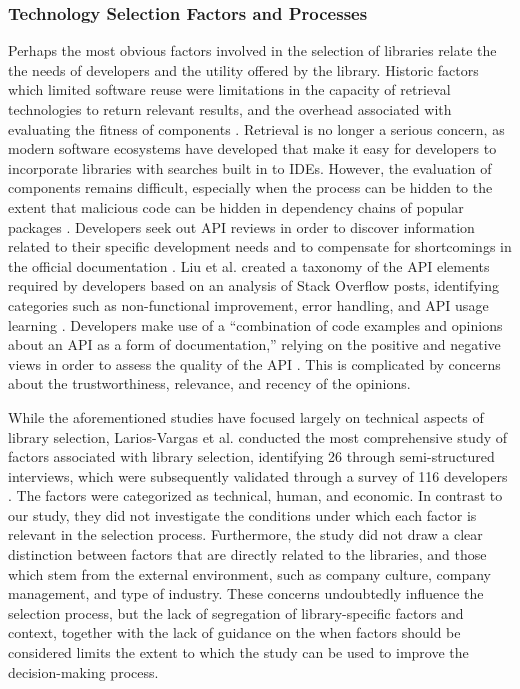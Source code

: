 \subsubsection{Technology Selection Factors and Processes}\label{sec:lit:processes}

Perhaps the most obvious factors involved in the selection of libraries relate the the needs of developers and the utility offered by the library. Historic factors which limited software reuse were limitations in the capacity of retrieval technologies to return relevant results, and the overhead associated with evaluating the fitness of components \cite{hummel2008code}. Retrieval is no longer a serious concern, as modern software ecosystems have developed that make it easy for developers to incorporate libraries with searches built in to IDEs. However, the evaluation of components remains difficult, especially when the process can be hidden to the extent that malicious code can be hidden in dependency chains of popular packages \cite{wyss2022wolf}. Developers seek out API reviews in order to discover information related to their specific development needs and to compensate for shortcomings in the official documentation \cite{uddin2019understanding}. Liu et al. created a taxonomy of the API elements required by developers based on an analysis of Stack Overflow posts, identifying categories such as non-functional improvement, error handling, and API usage learning \cite{liu2021api}. Developers make use of a ``combination of code examples and opinions about an API as a form of documentation,'' relying on the positive and negative views in order to assess the quality of the API \cite{uddin2019understanding}. This is complicated by concerns about the trustworthiness, relevance, and recency of the opinions. %

While the aforementioned studies have focused largely on technical aspects of library selection, Larios-Vargas et al. conducted the most comprehensive study of factors associated with library selection, identifying 26 through semi-structured interviews, which were subsequently validated through a survey of 116 developers \cite{larios2020selecting}. The factors were categorized as technical, human, and economic. In contrast to our study, they did not investigate the conditions under which each factor is relevant in the selection process. Furthermore, the study did not draw a clear distinction between factors that are directly related to the libraries, and those which stem from the external environment, such as company culture, company management, and type of industry. These concerns undoubtedly influence the selection process, but the lack of segregation of library-specific factors and context, together with the lack of guidance on the when factors should be considered limits the extent to which the study can be used to improve the decision-making process. 

